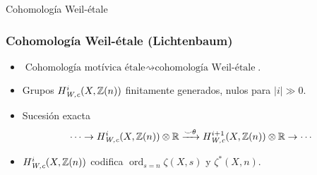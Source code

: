 \documentclass[handout]{beamer}
\newcommand{\RR}{\mathbb{R}}
\newcommand{\ZZ}{\mathbb{Z}}
\DeclareMathOperator{\ord}{ord}
\newcommand{\Wc}{\text{\it W,c}}
\begin{document}

\begin{frame}[plain]
  \headingfont

  \begin{center}
    {\huge Cohomología Weil-étale}
  \end{center}
\end{frame}


\begin{frame}
  \frametitle{Cohomología Weil-étale (Lichtenbaum)}

  \begin{itemize}
  \item<2-> $\text{Cohomología motívica étale} \rightsquigarrow
    \text{cohomología Weil-étale}$.

  \item<3-> Grupos $H^i_\Wc (X,\ZZ(n))$ finitamente generados, nulos para
    $|i| \gg 0$.

  \item<4-> Sucesión exacta
    $$\cdots \to H^i_\Wc (X,\ZZ(n)) \otimes \RR \xrightarrow{\smile\theta} H^{i+1}_\Wc (X,\ZZ(n)) \otimes \RR \to \cdots$$

  \item<5-> $H^i_\Wc (X, \ZZ(n))$ codifica $\ord_{s=n} \zeta (X,s)$ y $\zeta^* (X,n)$.
  \end{itemize}
\end{frame}

\end{document}
